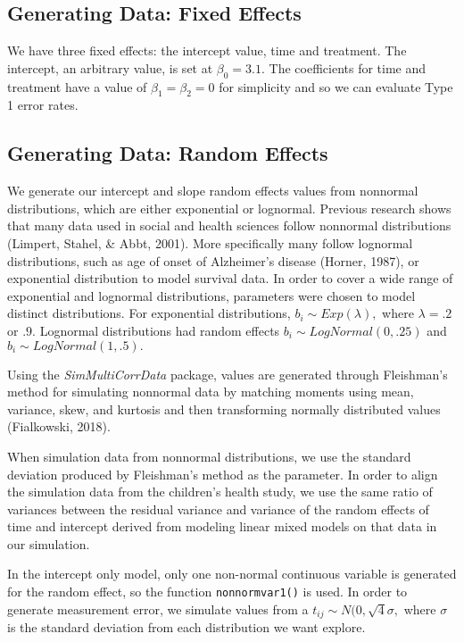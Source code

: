 \documentclass[12pt, twoside]{amherstthesis}
\begin{document}
\hypertarget{generating-data-fixed-effects}{%
\subsection{Generating Data: Fixed Effects}\label{generating-data-fixed-effects}}

We have three fixed effects: the intercept value, time and treatment. The intercept, an arbitrary value, is set at \(\beta_0 = 3.1\). The coefficients for time and treatment have a value of \(\beta_1 = \beta_2 = 0\) for simplicity and so we can evaluate Type 1 error rates.

\hypertarget{generating-data-random-effects}{%
\subsection{Generating Data: Random Effects}\label{generating-data-random-effects}}

We generate our intercept and slope random effects values from nonnormal distributions, which are either exponential or lognormal. Previous research shows that many data used in social and health sciences follow nonnormal distributions (Limpert, Stahel, \& Abbt, 2001). More specifically many follow lognormal distributions, such as age of onset of Alzheimer's disease (Horner, 1987), or exponential distribution to model survival data. In order to cover a wide range of exponential and lognormal distributions, parameters were chosen to model distinct distributions. For exponential distributions, \(b_i\sim\mathit{Exp}(\lambda),\) where \(\lambda = .2\) or \(.9.\) Lognormal distributions had random effects \(b_i\sim\mathit{LogNormal}(0,.25)\) and \(b_i\sim\mathit{LogNormal}(1,.5).\)

Using the \emph{SimMultiCorrData} package, values are generated through Fleishman's method for simulating nonnormal data by matching moments using mean, variance, skew, and kurtosis and then transforming normally distributed values (Fialkowski, 2018).

When simulation data from nonnormal distributions, we use the standard deviation produced by Fleishman's method as the parameter. In order to align the simulation data from the children's health study, we use the same ratio of variances between the residual variance and variance of the random effects of time and intercept derived from modeling linear mixed models on that data in our simulation.

In the intercept only model, only one non-normal continuous variable is generated for the random effect, so the function \texttt{nonnormvar1()} is used. In order to generate measurement error, we simulate values from a \(t_{ij}\sim\mathit{N}(0,\sqrt{4}\sigma,\) where \(\sigma\) is the standard deviation from each distribution we want explore.
\end{document}
